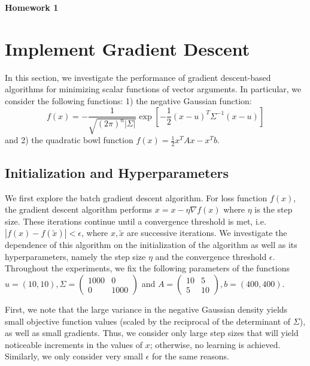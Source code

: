 \documentclass[10pt,psamsfonts]{amsart}
\theoremstyle{definition}
\theoremstyle{remark}
\numberwithin{equation}{section}
\begin{document}
	

\begin{center}
	{\bf Homework 1}
\end{center}

\section{Implement Gradient Descent}

In this section, we investigate the performance of gradient descent-based algorithms for minimizing scalar functions of vector arguments. In particular, we consider the following functions: 1) the negative Gaussian function:
$$f(x) = -\frac{1}{\sqrt{(2\pi)^n |\Sigma|}} \exp\left[ -\frac{1}{2}(x-u)^T\Sigma^{-1}(x-u) \right]$$
and 2) the quadratic bowl function $f(x) = \frac{1}{2}x^TAx - x^Tb$.
\subsection{Initialization and Hyperparameters} We first explore the batch gradient descent algorithm. For loss function $f(x)$, the gradient descent algorithm performs $x = x - \eta \nabla f(x)$
where $\eta$ is the step size. These iterations continue until a convergence threshold is met, i.e. $|f(x) - f(\tilde{x})| < \epsilon$, where $x, \tilde{x}$ are successive iterations. We investigate the dependence of this algorithm on the initialization of the algorithm as well as its hyperparameters, namely the step size $\eta$ and the convergence threshold $\epsilon$. Throughout the experiments, we fix the following parameters of the functions $u = (10, 10),\Sigma = \begin{pmatrix} 1000 & 0 \\ 0 & 1000\end{pmatrix}$ and $A = \begin{pmatrix} 10 & 5 \\ 5 & 10\end{pmatrix},b = (400, 400)$.

First, we note that the large variance in the negative Gaussian density yields small objective function values (scaled by the reciprocal of the determinant of $\Sigma$), as well as small gradients. Thus, we consider only large step sizes that will yield noticeable increments in the values of $x$; otherwise, no learning is achieved. Similarly, we only consider very small $\epsilon$ for the same reasons.
\end{document}
